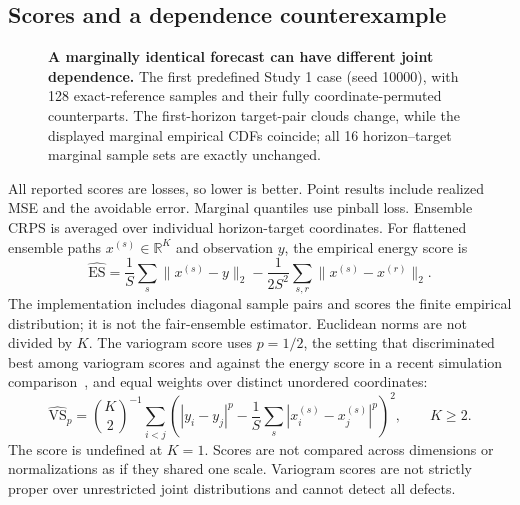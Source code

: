 \documentclass[11pt,a4paper]{article}
\newcommand{\R}{\mathbb{R}}
\begin{document}
\subsection{Scores and a dependence counterexample}

\begin{figure}[!t]
\centering

\caption{\textbf{A marginally identical forecast can have different joint dependence.}
The first predefined Study 1 case (seed 10000), with 128 exact-reference
samples and their fully coordinate-permuted counterparts. The first-horizon
target-pair clouds change, while the displayed marginal empirical CDFs
coincide; all 16 horizon--target marginal sample sets are exactly unchanged.}
\label{fig:dependence}
\end{figure}


All reported scores are losses, so lower is better. Point results include
realized MSE and the avoidable error. Marginal quantiles
use pinball loss. Ensemble CRPS is averaged over individual horizon-target
coordinates. For flattened ensemble paths $x^{(s)}\in\R^K$ and observation
$y$, the empirical energy score is
\begin{equation}
 \widehat{\mathrm{ES}} = \frac1S\sum_s\|x^{(s)}-y\|_2
 -\frac{1}{2S^2}\sum_{s,r}\|x^{(s)}-x^{(r)}\|_2.
\end{equation}
The implementation includes diagonal sample pairs and scores the finite
empirical distribution; it is not the fair-ensemble estimator. Euclidean
norms are not divided by $K$. The variogram score uses $p=1/2$, the
setting that discriminated best among variogram scores and against the
energy score in a recent simulation
comparison~\cite{alexander2024evaluating}, and equal weights over distinct
unordered coordinates:
\begin{equation}
 \widehat{\mathrm{VS}}_{p} = \binom K2^{-1}
 \sum_{i<j}\left(|y_i-y_j|^p-
       \frac1S\sum_s|x_i^{(s)}-x_j^{(s)}|^p\right)^2,
 \qquad K\geq2.
\end{equation}
The score is undefined at $K=1$. Scores are not compared across dimensions
or normalizations as if they shared one scale. Variogram scores are not
strictly proper over unrestricted joint distributions and cannot detect
all defects.
\end{document}
